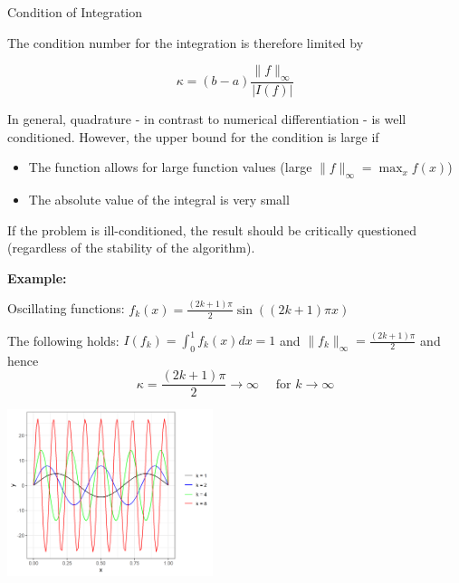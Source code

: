 \documentclass[11pt,compress,t,notes=noshow, xcolor=table]{beamer}
\begin{document}
\begin{vbframe}{Condition of Integration}
\framebreak

The condition number for the integration is therefore limited by

\vspace*{-0.2cm}
$$
\kappa = (b - a) \frac{\|f\|_\infty}{|I(f)|}
$$

In general, quadrature - in contrast to numerical differentiation - is well conditioned.
However, the upper bound for the condition is large if

\begin{itemize}
\item The function allows for large function values (large $\|f\|_\infty = \max_x f(x)$)
\item The absolute value of the integral is very small
\end{itemize}

If the problem is ill-conditioned, the result should be critically questioned (regardless of the stability of the algorithm).

\framebreak

\textbf{Example:}

Oscillating functions: $f_k(x) = \frac{(2k + 1)\pi}{2}\sin((2k+1)\pi x)$

\lz

The following holds: $I(f_k) = \int_0^1 f_k(x) dx = 1$ and $\|f_k\|_\infty = \frac{(2k+1)\pi}{2}$ and hence
\vspace{-0.1cm}
$$
\kappa = \frac{(2k+1)\pi}{2} \to \infty \quad \text{ for } k \to \infty
$$

\begin{center}
\includegraphics[width=0.45\textwidth]{figure_man/Example1.png}
\end{center}

%
%



\end{vbframe}
\end{document}
